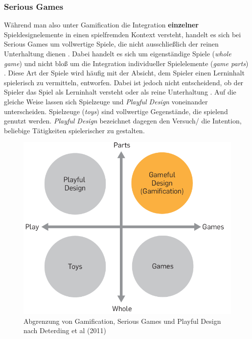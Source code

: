 \subsubsection{Serious Games}
Während man also unter Gamification die Integration \textbf{einzelner} Spieldesignelemente in einen spielfremden Kontext versteht, handelt es sich bei Serious Games um vollwertige Spiele, die nicht ausschließlich der reinen Unterhaltung dienen \cite[S. 17]{michael_serious_2005}. Dabei handelt es sich um eigenständige Spiele (\textit{whole game}) und nicht bloß um die Integration individueller Spielelemente (\textit{game parts}) \cite{deterding_game_2011}. Diese Art der Spiele wird häufig mit der Absicht, dem Spieler einen Lerninhalt spielerisch zu vermitteln, entworfen. Dabei ist jedoch nicht entscheidend, ob der Spieler das Spiel als Lerninhalt versteht oder als reine Unterhaltung \cite[S.3]{bopp_serious_2009}. Auf die gleiche Weise lassen sich Spielzeuge und \textit{Playful Design} voneinander unterscheiden. Spielzeuge (\textit{toys}) sind vollwertige Gegenstände, die spielend genutzt werden. \textit{Playful Design} bezeichnet dagegen den Versuch/ die Intention, beliebige Tätigkeiten spielerischer zu gestalten.

\begin{figure}[htp]
    \centering
    \includegraphics{img/detering_gamificatrion_pic.png}
    \caption{Abgrenzung von Gamification, Serious Games und Playful Design nach Deterding et al (2011)}
    \label{fig:deterding}
\end{figure}

